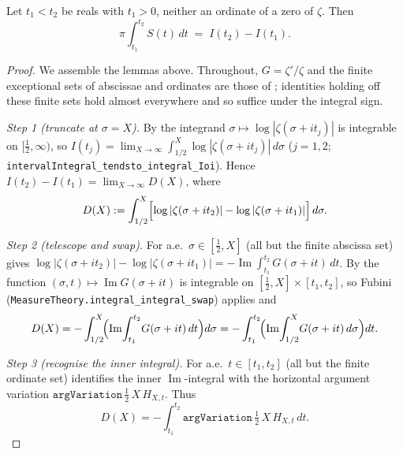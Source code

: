 \begin{lemma}
\label{lem:lb_littlewood}
\leanok
{}
Let $t_1<t_2$ be reals with $t_1>0$, neither an ordinate of a zero of $\zeta$.
Then
\[
  \pi\int_{t_1}^{t_2} S(t)\,dt \;=\; I(t_2) - I(t_1).
\]
\end{lemma}

\begin{proof}
\leanok
{}
We assemble the lemmas above. Throughout, $G=\zeta'/\zeta$ and the
finite exceptional sets of abscissae and ordinates are those of
; identities holding off these finite sets hold
almost everywhere and so suffice under the integral sign.

\emph{Step 1 (truncate at $\sigma=X$).} By  the integrand
$\sigma\mapsto\log|\zeta(\sigma+it_j)|$ is integrable on $[\tfrac12,\infty)$, so
$I(t_j)=\lim_{X\to\infty}\int_{1/2}^{X}\log|\zeta(\sigma+it_j)|\,d\sigma$
($j=1,2$; \texttt{intervalIntegral\_tendsto\_integral\_Ioi}). Hence
$I(t_2)-I(t_1)=\lim_{X\to\infty}D(X)$, where
\[
  D(X):=\int_{1/2}^{X}\Bigl[\log|\zeta(\sigma+it_2)|-\log|\zeta(\sigma+it_1)|\Bigr]\,d\sigma .
\]

\emph{Step 2 (telescope and swap).} For a.e.\ $\sigma\in[\tfrac12,X]$ (all but the
finite abscissa set)  gives
$\log|\zeta(\sigma+it_2)|-\log|\zeta(\sigma+it_1)|
=-\operatorname{Im}\int_{t_1}^{t_2}G(\sigma+it)\,dt$. By
 the function $(\sigma,t)\mapsto\operatorname{Im}
G(\sigma+it)$ is integrable on $[\tfrac12,X]\times[t_1,t_2]$, so Fubini
(\texttt{MeasureTheory.integral\_integral\_swap}) applies and
\[
  D(X)
  =-\int_{1/2}^{X}\!\Bigl(\operatorname{Im}\!\int_{t_1}^{t_2}\!G(\sigma+it)\,dt\Bigr)d\sigma
  =-\int_{t_1}^{t_2}\!\Bigl(\operatorname{Im}\!\int_{1/2}^{X}\!G(\sigma+it)\,d\sigma\Bigr)dt .
\]

\emph{Step 3 (recognise the inner integral).} For a.e.\ $t\in[t_1,t_2]$ (all but
the finite ordinate set)  identifies the inner
$\operatorname{Im}$-integral with the horizontal argument variation
$\texttt{argVariation}\,\tfrac12\,X\,H_{X,t}$. Thus
\[
  D(X)=-\int_{t_1}^{t_2}\texttt{argVariation}\,\tfrac12\,X\,H_{X,t}\,dt .
\]


\end{proof}

